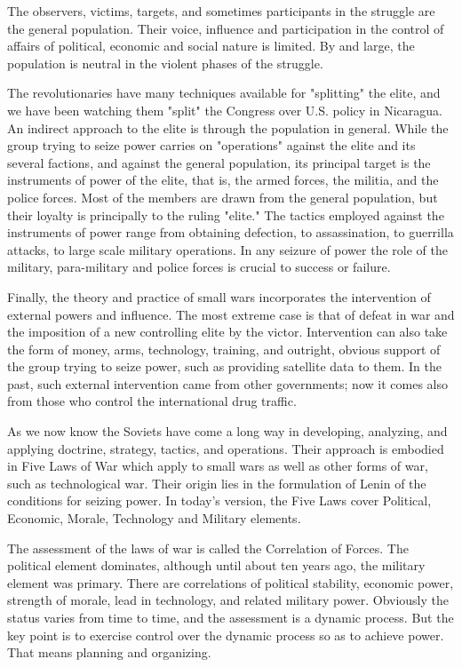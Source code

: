 The observers, victims, targets, and sometimes participants in the struggle are the general population. Their voice, influence and participation in the control of affairs of political, economic and social nature is limited. By and large, the population is neutral in the violent phases of the struggle.

The revolutionaries have many techniques available for "splitting" the elite, and we have been watching them "split" the Congress over U.S. policy in Nicaragua. An indirect approach to the elite is through the population in general. While the group trying to seize power carries on "operations" against the elite and its several factions, and against the general population, its principal target is the instruments of power of the elite, that is, the armed forces, the militia, and the police forces. Most of the members are drawn from the general population, but their loyalty is principally to the ruling "elite." The tactics employed against the instruments of power range from obtaining defection, to assassination, to guerrilla attacks, to large scale military operations. In any seizure of power the role of the military, para-military and police forces is crucial to success or failure.

Finally, the theory and practice of small wars incorporates the intervention of external powers and influence. The most extreme case is that of defeat in war and the imposition of a new controlling elite by the victor. Intervention can also take the form of money, arms, technology, training, and outright, obvious support of the group trying to seize power, such as providing satellite data to them. In the past, such external intervention came from other governments; now it comes also from those who control the international drug traffic.

As we now know the Soviets have come a long way in developing, analyzing, and applying doctrine, strategy, tactics, and operations. Their approach is embodied in Five Laws of War which apply to small wars as well as other forms of war, such as technological war. Their origin lies in the formulation of Lenin of the conditions for seizing power. In today's version, the Five Laws cover Political, Economic, Morale, Technology and Military elements.

The assessment of the laws of war is called the Correlation of Forces. The political element dominates, although until about ten years ago, the military element was primary. There are correlations of political stability, economic power, strength of morale, lead in technology, and related military power. Obviously the status varies from time to time, and the assessment is a dynamic process. But the key point is to exercise control over the dynamic process so as to achieve power. That means planning and organizing.

